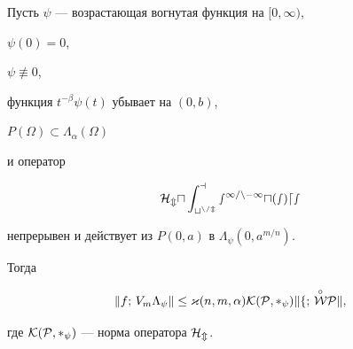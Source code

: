 




\begin{lem} 


Пусть $\psi$ --- возрастающая вогнутая функция на $[0,\infty)$,


$\psi(0)=0$,


$\psi\not\equiv 0$, 


функция $t^{-\beta}\psi(t)$ убывает на $(0,b)$, 


$P(\Omega)\subset\Lambda_\alpha(\Omega)$ 


и оператор 


$$ 


\cal H_m u\int^a_{t^{n/m}}s^{1/n-1}u(s)ds 


$$ 


непрерывен и действует из $P(0,a)$ в $\Lambda_\psi(0,a^{m/n})$. 


Тогда 


\begin{equation} 




\|f;\,V_m\Lambda_\psi\| \le \varkappa(n,m,\alpha)\cal K(P,\Lambda_\psi) 


\|f;\,\overset{\circ}{W}P\|, 


\end{equation} 


где $\cal K(P,\Lambda_\psi)$ --- норма оператора $\cal H_m$. 


\end{lem} 


 


